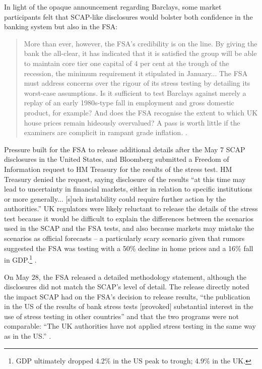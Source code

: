 \documentclass[12pt]{article}
\begin{document}
In light of the opaque announcement regarding Barclays, some market participants felt that SCAP-like disclosures would bolster both confidence in the banking system but also in the FSA:

\begin{quote}
  More than ever, however, the FSA’s credibility is on the line. By giving the bank the all-clear, it has indicated that it is satisfied the group will be able to maintain core tier one capital of 4 per cent at the trough of the recession, the minimum requirement it stipulated in January... The FSA must address concerns over the rigour of its stress testing by detailing its worst-case assumptions. Is it sufficient to test Barclays against merely a replay of an early 1980s-type fall in employment and gross domestic product, for example? And does the FSA recognise the extent to which UK house prices remain hideously overvalued? A pass is worth little if the examiners are complicit in rampant grade inflation. \citep{Lex}.
\end{quote}

Pressure built for the FSA to release additional details after the May 7 SCAP disclosures in the United States, and Bloomberg submitted a Freedom of Information request to HM Treasury for the results of the stress test. HM Treasury denied the request, saying disclosure of the results ``at this time may lead to uncertainty in financial markets, either in relation to specific institutions or more generally... [s]uch instability could require further action by the authorities.'' UK regulators were likely reluctant to release the details of the stress test because it would be difficult to explain the differences between the scenarios used in the SCAP and the FSA tests, and also because markets may mistake the scenarios as official forecasts -- a particularly scary scenario given that rumors suggested the FSA was testing with a 50\% decline in home prices and a 16\% fall in GDP.\footnote{GDP ultimately dropped 4.2\% in the US peak to trough; 4.9\% in the UK.} \citep{Murphy}.

On May 28, the FSA released a detailed methodology statement, although the disclosures did not match the SCAP's level of detail. The release directly noted the impact SCAP had on the FSA's decision to release results, ``the publication in the US of the results of bank stress tests [provoked] substantial interest in the use of stress testing in other countries'' and that the two programs were not comparable: ``The UK authorities have not applied stress testing in the same way as in the US.'' \citep{Results}.
\end{document}
